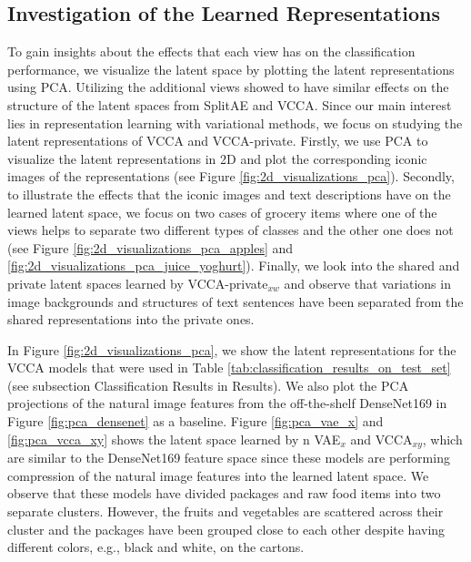



\subsection{Investigation of the Learned Representations}
\label{sec:investigation_of_the_learned_representations}

To gain insights about the effects that each view has on the classification performance, we visualize the latent space by plotting the latent representations using PCA. Utilizing the additional views showed to have similar effects on the structure of the latent spaces from SplitAE and VCCA. 
Since our main interest lies in representation learning with variational methods, we focus on studying the latent representations of VCCA and VCCA-private. 
Firstly, we use PCA to visualize the latent representations in 2D and plot the corresponding iconic images of the representations (see Figure \ref{fig:2d_visualizations_pca}). Secondly, to illustrate the effects that the iconic images and text descriptions have on the learned latent space, we focus on two cases of grocery items where one of the views helps to separate two different types of classes and the other one does not (see Figure \ref{fig:2d_visualizations_pca_apples} and \ref{fig:2d_visualizations_pca_juice_yoghurt}). Finally, we look into the shared and private latent spaces learned by VCCA-private$_{x w}$ and observe that variations in image backgrounds and structures of text sentences have been separated from the shared representations into the private ones. 

In Figure \ref{fig:2d_visualizations_pca}, we show the latent representations for the VCCA models that were used in Table \ref{tab:classification_results_on_test_set} (see subsection Classification Results in Results).
We also plot the PCA projections of the natural image features from the off-the-shelf DenseNet169 in Figure \ref{fig:pca_densenet} as a baseline. Figure \ref{fig:pca_vae_x} and \ref{fig:pca_vcca_xy} shows the latent space learned by n VAE$_{x}$ and VCCA$_{x y}$, which are similar to the DenseNet169 feature space since these models are performing compression of the natural image features into the learned latent space. We observe that these models have divided packages and raw food items into two separate clusters. However, the fruits and vegetables are scattered across their cluster and the packages have been grouped close to each other despite having different colors, e.g., black and white, on the cartons. 

